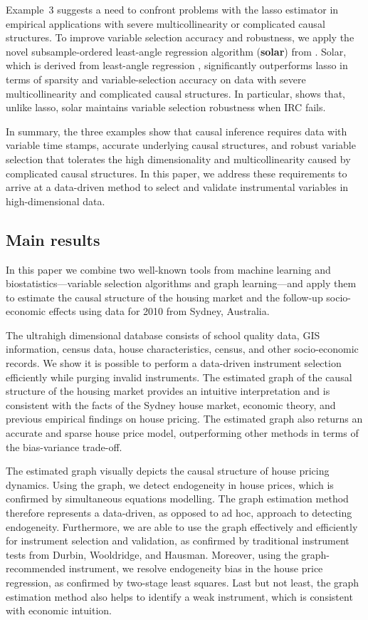 \documentclass[11pt,review,authoryear]{elsarticle}
\begin{document}
Example~3 suggests a need to confront problems with the lasso estimator in empirical applications with severe multicollinearity or complicated causal structures. To improve variable selection accuracy and robustness, we apply the novel subsample-ordered least-angle regression algorithm (\textbf{solar}) from \citet{ning2019solar}. Solar, which is derived from least-angle regression \citep{efronall04}, significantly outperforms lasso in terms of sparsity and variable-selection accuracy on data with severe multicollinearity and complicated causal structures. In particular, \citet{ning2019solar} shows that, unlike lasso, solar maintains variable selection robustness when IRC fails.

In summary, the three examples show that causal inference requires data with variable time stamps, accurate underlying causal structures, and robust variable selection that tolerates the high dimensionality and multicollinearity caused by complicated causal structures. In this paper,  we address these requirements to arrive at a data-driven method to select and validate instrumental variables in high-dimensional data.

\subsection{Main results}

In this paper we combine two well-known tools from machine learning and biostatistics---variable selection algorithms and graph learning---and apply them to estimate the causal structure of the housing market and the follow-up socio-economic effects using data for 2010 from Sydney, Australia.

The ultrahigh dimensional database consists of school quality data, GIS information, census data, house characteristics, census, and other socio-economic records. We show it is possible to perform a data-driven instrument selection efficiently while purging invalid instruments. The estimated graph of the causal structure of the housing market provides an intuitive interpretation and is consistent with the facts of the Sydney house market, economic theory, and previous empirical findings on house pricing. The estimated graph also returns an accurate and sparse house price model, outperforming other methods in terms of the bias-variance trade-off.

The estimated graph visually depicts the causal structure of house pricing dynamics. Using the graph, we detect endogeneity in house prices, which is confirmed by simultaneous equations modelling. The graph estimation method therefore represents a data-driven, as opposed to ad hoc, approach to detecting endogeneity. Furthermore, we are able to use the graph effectively and efficiently for instrument selection and validation, as confirmed by traditional instrument tests from Durbin, Wooldridge, and Hausman. Moreover, using the graph-recommended instrument, we resolve endogeneity bias in the house price regression, as confirmed by two-stage least squares. Last but not least, the graph estimation method also helps to identify a weak instrument, which is consistent with economic intuition.
\end{document}
